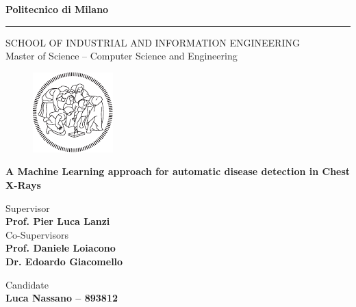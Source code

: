 \documentclass[a4paper,12pt,openright,notitlepage,twoside]{book}
\begin{document}
\thispagestyle{empty} %

\begin{center}
\Large{\textbf{Politecnico di Milano}} \\
\vspace{-4mm}
\rule{\textwidth}{0.4pt}
\normalsize{SCHOOL OF INDUSTRIAL AND INFORMATION ENGINEERING} \\
\normalsize{Master of Science -- Computer Science and Engineering} \\
\vspace{20mm}
\begin{figure}[h!]
\centering
\includegraphics[height=0.20\textheight]{images/logo_poli_bianco}
\end{figure}
\vspace{12mm}
\huge{\textbf{A Machine Learning approach for automatic disease detection in Chest X-Rays}} \\
\vspace{22mm}
\end{center}

\begin{flushleft}
\normalsize{Supervisor} \\
\small{\textbf{Prof. Pier Luca Lanzi}} \\
\vspace{5mm}
\normalsize{Co-Supervisors} \\
\small{\textbf{Prof. Daniele Loiacono}} \\
\small{\textbf{Dr. Edoardo Giacomello}} \\
\end{flushleft}
\vspace{10mm}

\begin{flushright}
\normalsize{Candidate} \\
\small{\textbf{Luca Nassano -- 893812}} \\
\end{flushright}
\vspace{13mm}
\end{document}
